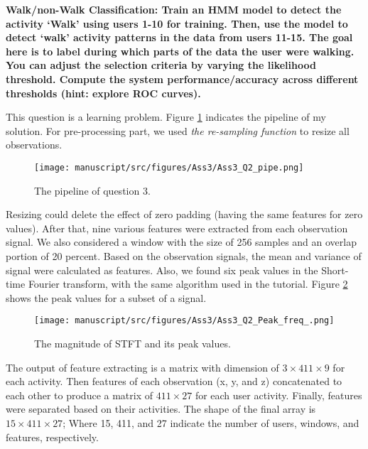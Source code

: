 \item \textbf{Walk/non-Walk Classification: Train an HMM model to detect the activity ‘Walk’ using users 1-10 for training. Then, use the model to detect ‘walk’ activity patterns in the data from users 11-15. The goal here is to label during which parts of the data the user were walking. You can adjust the selection criteria by varying the likelihood threshold. Compute the system performance/accuracy across different thresholds (hint: explore ROC curves).}

This question is a learning problem. Figure \ref{fig:pipeline} indicates the pipeline of my solution. For pre-processing part, we used \emph{the re-sampling function} to resize all observations.
\begin{figure}[H]
    \centering
    \begin{minipage}[b]{0.3\textwidth}
        \texttt{[image: manuscript/src/figures/Ass3/Ass3\_Q2\_pipe.png]}
    \end{minipage}
    \caption{The pipeline of question 3.}
    \label{fig:pipeline}
\end{figure}

Resizing could delete the effect of zero padding (having the same features for zero values). After that, nine various features were extracted from each observation signal. We also considered a window with the size of 256 samples and an overlap portion of 20 percent. Based on the observation signals, the mean and variance of signal were calculated as features. Also, we found six peak values in the Short-time Fourier transform, with the same algorithm used in the tutorial. Figure \ref{fig:Ass3_Q2_Peak_freq_} shows the peak values for a subset of a signal.


\begin{figure}[H]
    \centering
    \begin{minipage}[b]{1\textwidth}
        \texttt{[image: manuscript/src/figures/Ass3/Ass3\_Q2\_Peak\_freq\_.png]}
    \end{minipage}
    \caption{The magnitude of STFT and its peak values.}
    \label{fig:Ass3_Q2_Peak_freq_}
\end{figure}


The output of feature extracting is a matrix with dimension of $3 \times 411 \times 9$ for each activity. 
Then features of each observation (x, y, and z) concatenated to each other to produce a matrix of $411 \times 27$ for each user activity. Finally, features were separated based on their activities. The shape of the final array is $15 \times 411 \times 27$; Where 15, 411, and 27 indicate the number of users, windows, and features, respectively.


